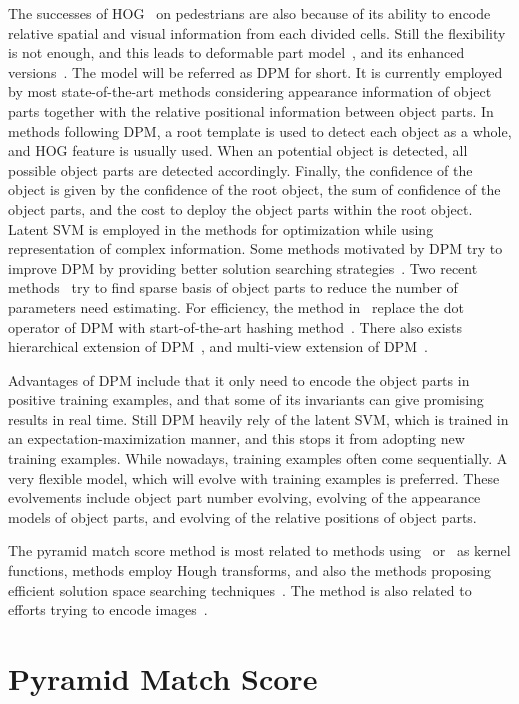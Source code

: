 \documentclass[paper]{ieice}
\begin{document}
The successes of HOG~\cite{ij4} on pedestrians are also because of its ability to encode relative spatial and visual information from each divided cells. Still the flexibility is not enough, and this leads to deformable part model~\cite{ac30,dpm1}, and its enhanced versions~\cite{ac31,dpm2}. The model will be referred as DPM for short. It is currently employed by most state-of-the-art methods considering  appearance information of object parts together with the relative positional information between object parts. In methods following DPM, a root template is used to detect each object as a whole, and HOG feature is usually used. When an potential object is detected, all possible object parts are detected accordingly. Finally, the confidence of the object is given by the confidence of the root object, the sum of confidence of the object parts, and the cost to deploy the object parts within the root object. Latent SVM is employed in the methods for optimization while using representation of complex information. Some methods motivated by DPM try to improve DPM by providing better solution searching strategies~\cite{dpm3}.  Two recent methods~\cite{spm,spltm} try to find sparse basis of object parts to reduce the number of parameters need estimating. For efficiency, the method in~\cite{408} replace the dot operator of DPM with start-of-the-art hashing method~\cite{lsh}. There also exists hierarchical extension of DPM~\cite{hdpm}, and multi-view extension of DPM~\cite{mvdpm}.

Advantages of DPM include that it only need to encode the object parts in positive training examples, and that  some of its invariants can give promising results in real time. Still DPM heavily rely of the latent SVM, which is trained in an  expectation-maximization manner, and this stops it from adopting new training examples. While nowadays, training examples often come sequentially. A very flexible model, which will evolve with training examples is preferred. These evolvements include object part number evolving, evolving of the appearance models of object parts, and evolving of the relative positions of object parts.



The pyramid match score method is most related to methods using~\cite{pmk} or~\cite{kmts} as kernel functions, methods employ Hough transforms, and also the methods proposing efficient solution space searching techniques~\cite{bab}. The method is also related to efforts trying to encode images~\cite{spen}.


\section{Pyramid Match Score}
\end{document}
